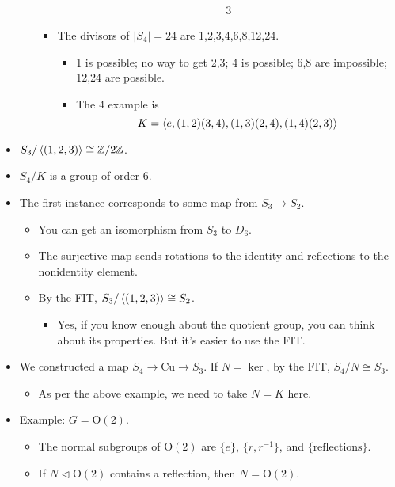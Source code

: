 \documentclass[../notes.tex]{subfiles}
\begin{document}
\begin{itemize}
\begin{itemize}
\begin{itemize}
\begin{align*}
                3
            \end{align*}
            \item The divisors of $|S_4|=24$ are 1,2,3,4,6,8,12,24.
            \begin{itemize}
                \item 1 is possible; no way to get 2,3; 4 is possible; 6,8 are impossible; 12,24 are possible.
                \item The 4 example is
                \begin{equation*}
                    K = \left\langle{e,(1,2)(3,4),(1,3)(2,4),(1,4)(2,3)}\right\rangle
                \end{equation*}
            \end{itemize}
        \end{itemize}
    \end{itemize}
    \item $S_3/\left\langle{(1,2,3)}\right\rangle\cong\mathbb{Z}/2\mathbb{Z}$.
    \item $S_4/K$ is a group of order 6.
    \item The first instance corresponds to some map from $S_3\to S_2$.
    \begin{itemize}
        \item You can get an isomorphism from $S_3$ to $D_6$.
        \item The surjective map sends rotations to the identity and reflections to the nonidentity element.
        \item By the FIT, $S_3/\left\langle{(1,2,3)}\right\rangle\cong S_2$.
        \begin{itemize}
            \item Yes, if you know enough about the quotient group, you can think about its properties. But it's easier to use the FIT.
        \end{itemize}
    \end{itemize}
    \item We constructed a map $S_4\to\text{Cu}\to S_3$. If $N=\ker$, by the FIT, $S_4/N\cong S_3$.
    \begin{itemize}
        \item As per the above example, we need to take $N=K$ here.
    \end{itemize}
    \item Example: $G=\text{O}(2)$.
    \begin{itemize}
        \item The normal subgroups of $\text{O}(2)$ are $\{e\}$, $\{r,r^{-1}\}$, and $\{\text{reflections}\}$.
        \item If $N\triangleleft\text{O}(2)$ contains a reflection, then $N=\text{O}(2)$.

\end{itemize}
\end{itemize}
\end{document}
